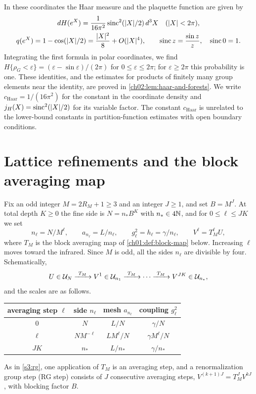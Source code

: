 In these coordinates the Haar measure and the plaquette function are given by
\begin{equation}\label{ch01:eq:haar-coordinates}
 \begin{gathered}
 dH(e^X)=\frac1{16\pi^2}\operatorname{sinc}^2(\lvert X\rvert/2)\,d^3X\quad(\lvert X\rvert<2\pi),\\
 q(e^X)=1-\cos(\lvert X\rvert/2)=\frac{\lvert X\rvert^2}8+O(\lvert X\rvert^4),\qquad
 \operatorname{sinc} z=\frac{\sin z}{z},\quad \operatorname{sinc}0=1.
 \end{gathered}
\end{equation}
Integrating the first formula in polar coordinates, we find $H\{\rho_G<\varepsilon\}=(\varepsilon-\sin\varepsilon)/(2\pi)$ for $0\le\varepsilon\le2\pi$; for $\varepsilon\ge2\pi$ this probability is one. These identities, and the estimates for products of finitely many group elements near the identity, are proved in \cref{ch02:lem:haar-and-forests}. We write $c_{\mathrm{Haar}}=1/(16\pi^2)$ for the constant in the coordinate density and $j_H(X)=\operatorname{sinc}^2(\lvert X\rvert/2)$ for its variable factor. The constant $c_{\mathrm{Haar}}$ is unrelated to the lower-bound constants in partition-function estimates with open boundary conditions.

\section{Lattice refinements and the block averaging map}\label{ch01:sec:hierarchy}

Fix an odd integer $M=2R_M+1\ge3$ and an integer $J\ge1$, and set $B=M^J$. At total depth $K\ge0$ the fine side is $N=n_*B^K$ with $n_*\in4\mathbb N$, and for $0\le\ell\le JK$ we set
\[
 n_\ell=N/M^\ell,\qquad a_{n_\ell}=L/n_\ell,\qquad g_\ell^2=h_\ell=\gamma/n_\ell,\qquad V^\ell=T_M^\ell U,
\]
where $T_M$ is the block averaging map of \cref{ch01:def:block-map} below. Increasing $\ell$ moves toward the infrared. Since $M$ is odd, all the sides $n_\ell$ are divisible by four. Schematically,
\[
 U\in\Conf N\xrightarrow{\ T_M\ }V^1\in\Conf{n_1}\xrightarrow{\ T_M\ }\cdots\xrightarrow{\ T_M\ }V^{JK}\in\Conf{n_*},
\]
and the scales are as follows.
\begin{center}
\begin{tabular}{cccc}
\toprule
averaging step $\ell$ & side $n_\ell$ & mesh $a_{n_\ell}$ & coupling $g_\ell^2$\\
\midrule
$0$ & $N$ & $L/N$ & $\gamma/N$\\
$\ell$ & $NM^{-\ell}$ & $LM^\ell/N$ & $\gamma M^\ell/N$\\
$JK$ & $n_*$ & $L/n_*$ & $\gamma/n_*$\\
\bottomrule
\end{tabular}
\end{center}
As in \cref{s3:rg}, one application of $T_M$ is an averaging step, and a renormalization group step (RG step) consists of $J$ consecutive averaging steps, $V^{(k+1)J}=T_M^JV^{kJ}$, with blocking factor $B$.

